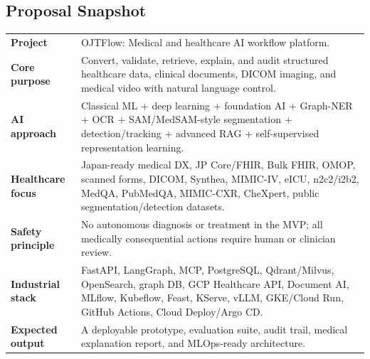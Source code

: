 \subsection*{Proposal Snapshot}

\begin{tabularx}{\textwidth}{p{}X}
\toprule
\textbf{Project} & OJTFlow: Medical and healthcare AI workflow platform. \\
\textbf{Core purpose} & Convert, validate, retrieve, explain, and audit structured healthcare data, clinical documents, DICOM imaging, and medical video with natural language control. \\
\textbf{AI approach} & Classical ML + deep learning + foundation AI + Graph-NER + OCR + SAM/MedSAM-style segmentation + detection/tracking + advanced RAG + self-supervised representation learning. \\
\textbf{Healthcare focus} & Japan-ready medical DX, JP Core/FHIR, Bulk FHIR, OMOP, scanned forms, DICOM, Synthea, MIMIC-IV, eICU, n2c2/i2b2, MedQA, PubMedQA, MIMIC-CXR, CheXpert, public segmentation/detection datasets. \\
\textbf{Safety principle} & No autonomous diagnosis or treatment in the MVP; all medically consequential actions require human or clinician review. \\
\textbf{Industrial stack} & FastAPI, LangGraph, MCP, PostgreSQL, Qdrant/Milvus, OpenSearch, graph DB, GCP Healthcare API, Document AI, MLflow, Kubeflow, Feast, KServe, vLLM, GKE/Cloud Run, GitHub Actions, Cloud Deploy/Argo CD. \\
\textbf{Expected output} & A deployable prototype, evaluation suite, audit trail, medical explanation report, and MLOps-ready architecture. \\
\bottomrule
\end{tabularx}
